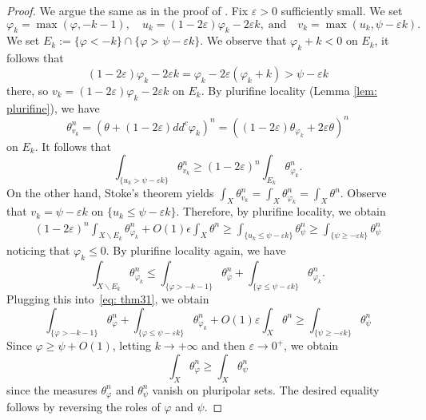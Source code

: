 \documentclass[a4paper]{amsart}
\numberwithin{equation}{section}
\theoremstyle{definition}
\numberwithin{equation}{section}
\begin{document}
\begin{proof}
We argue the same as in the proof of \cite[Theorem 4.1]{Ahag09-MA-pluripolar}. Fix $\varepsilon>0$ sufficiently small.
We set
$$\varphi_k = \max (\varphi, - k - 1 ),\quad u_k = (1 - 2\varepsilon ) \varphi_k - 2\varepsilon k,\; \text{and}\quad v_k = \max ( u_k , \psi - \varepsilon k ).$$
We set $E_k := \{ \varphi < - k \} \cap \{ \varphi > \psi -\varepsilon k \}$. We observe that  $\varphi_k+k<0$ on $E_k$, it follows that
$$(1 - 2\varepsilon ) \varphi_k - 2\varepsilon k=\varphi_k-2\varepsilon(\varphi_k+k)>\psi-\varepsilon k $$ there, so $v_k=(1 - 2\varepsilon ) \varphi_k - 2\varepsilon k$ on $E_k$. By plurifine locality (Lemma \ref{lem: plurifine}), we have
$$\theta_{v_k}^n = (\theta + (1-2\varepsilon )dd^c \varphi_k )^n = ((1 -  2\varepsilon ) \theta_{ \varphi_k } + 2\varepsilon\theta )^n$$
on  $E_k$. It follows that
$$\int_{ \{u_k> \psi - \varepsilon k  \} } \theta_{ v_k }^n  \geq ( 1 - 2\varepsilon )^n \int_{ E_k }  \theta_{ \varphi_k }^n.$$
On the other hand, Stoke's theorem yields
$\int_{ X } \theta_{ v_k }^n = \int_{ X } \theta_{ \varphi_k }^n = \int_{ X } \theta^n.$ Observe that $v_k=\psi-\varepsilon k$ on $\{u_k\leq \psi-\varepsilon k \}$.
Therefore, by plurifine locality, we obtain
\begin{equation}\label{eq: thm31}
	\begin{split}
	(1 - 2\varepsilon )^{ n } \int_{ X\backslash E_k }  \theta_{ \varphi_k } ^n   + O(1) \epsilon \int_{ X } \theta^n  \geq \int_{ \{ u_k \leq  \psi - \varepsilon k \} }  \theta_{ \psi }^n  \geq \int_{ \{ \psi \geq  - \varepsilon k \} }  \theta_{ \psi }^n 
	\end{split}
\end{equation} noticing that $\varphi_k\leq 0$. By plurifine locality again, we have
\[ \int_{ X\backslash E_k }  \theta_{ \varphi_k } ^n \leq \int_{\{\varphi>-k-1\}}\theta_\varphi^n+\int_{\{\varphi\leq \psi-\varepsilon k\}}\theta_{\varphi_k}^n.\]
Plugging this into~\eqref{eq: thm31}, we obtain
\[ \int_{\{\varphi>-k-1\}} \theta_\varphi^n+\int_{\{\varphi\leq \psi -\varepsilon k\}}\theta_{\varphi_k}^n+O(1)\varepsilon\int_X\theta^n\geq \int_{\{\psi\geq -\varepsilon k\}}\theta_\psi^n\]
 Since $\varphi\geq \psi+ O(1)$, letting $k\to+\infty$ and then $\varepsilon\to 0^+$, we  obtain 
$$\int_{ X }  \theta_{ \varphi }^n  \geq \int_{ X } \theta_{ \psi }^n$$ since the measures $\theta_\varphi^n$ and $\theta_\psi^n$ vanish on pluripolar sets.
The desired equality follows by reversing the roles of $\varphi$ and $\psi$.


\end{proof}
\end{document}

